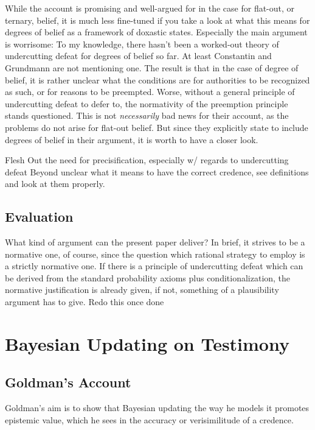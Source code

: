 \documentclass[11pt, a4paper]{scrartcl}
\renewcommand{\i}[1]{\emph{#1}}
\begin{document}
While the account is promising and well-argued for in the case for flat-out, or ternary, belief, it is much less fine-tuned if you take a look at what this means for degrees of belief as a framework of doxastic states. Especially the main argument is worrisome: To my knowledge, there hasn't been a worked-out theory of undercutting defeat for degrees of belief so far. At least Constantin and Grundmann are not mentioning one. The result is that in the case of degree of belief, it is rather unclear what the conditions are for authorities to be recognized as such, or for reasons to be preempted. Worse, without a general principle of undercutting defeat to defer to, the normativity of the preemption principle stands questioned. This is not \i{necessarily} bad news for their account, as the problems do not arise for flat-out belief. But since they explicitly state to include degrees of belief in their argument, it is worth to have a closer look.  

{\color{red} Flesh Out the need for precisification, especially w/ regards to undercutting defeat}
Beyond unclear what it means to have the correct credence, see definitions and look at them properly.

\subsection{Evaluation}

What kind of argument can the present paper deliver? In brief, it strives to be a normative one, of course, since the question which rational strategy to employ is a strictly normative one. If there is a principle of undercutting defeat which can be derived from the standard probability axioms plus conditionalization, the normative justification is already given, if not, something of a plausibility argument has to give.
{\color{red} Redo this once done}

\section{Bayesian Updating on Testimony}

\subsection{Goldman's Account}

Goldman's aim\textcite[103--130]{Goldman1999-GOLKIA} is to show that Bayesian updating the way he models it promotes epistemic value, which he sees in the accuracy or verisimilitude of a credence. 
\end{document}
